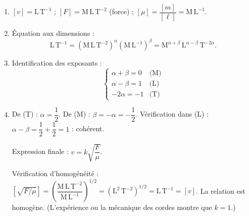 \documentclass[11pt]{article}
\begin{document}
\begin{corrige}
\begin{enumerate}
    \item $[v] = \text{L}\,\text{T}^{-1}$ ; $[F] = \text{M}\,\text{L}\,\text{T}^{-2}$ (force) ; $[\mu] = \dfrac{[m]}{[\ell]} = \text{M}\,\text{L}^{-1}$.
    \item Équation aux dimensions :
    \[ \text{L}\,\text{T}^{-1} = \left(\text{M}\,\text{L}\,\text{T}^{-2}\right)^{\alpha}\left(\text{M}\,\text{L}^{-1}\right)^{\beta} = \text{M}^{\alpha+\beta}\,\text{L}^{\alpha-\beta}\,\text{T}^{-2\alpha}. \]
    \item Identification des exposants :
    \[ \begin{cases} \alpha + \beta = 0 & \text{(M)} \\ \alpha - \beta = 1 & \text{(L)} \\ -2\alpha = -1 & \text{(T)} \end{cases} \]
    \item De (T) : $\alpha = \dfrac{1}{2}$. De (M) : $\beta = -\alpha = -\dfrac{1}{2}$. Vérification dans (L) : $\alpha - \beta = \dfrac{1}{2} + \dfrac{1}{2} = 1$ : cohérent.

    Expression finale : $\boxed{v = k\sqrt{\dfrac{F}{\mu}}}$.

    Vérification d'homogénéité : $\left[\sqrt{F/\mu}\right] = \left(\dfrac{\text{M}\,\text{L}\,\text{T}^{-2}}{\text{M}\,\text{L}^{-1}}\right)^{1/2} = \left(\text{L}^2\,\text{T}^{-2}\right)^{1/2} = \text{L}\,\text{T}^{-1} = [v]$. La relation est homogène. (L'expérience ou la mécanique des cordes montre que $k = 1$.)
\end{enumerate}
\end{corrige}
\end{document}
